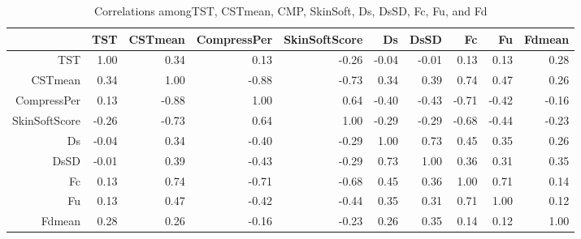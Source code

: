 \begin{center}
\begin{landscape}
\begin{table}[ht]
\caption{Correlations amongTST, CSTmean, CMP, SkinSoft, Ds, DsSD, Fc, Fu, and Fd} 
\vspace{0.2in}
\label{tab:collfibcor}
\begin{tabular}{|rrrrrrrrrr|}
  \hline
 & TST & CSTmean & CompressPer & SkinSoftScore & Ds & DsSD & Fc & Fu & Fdmean \\ 
  \hline
TST & 1.00 & 0.34 & 0.13 & -0.26 & -0.04 & -0.01 & 0.13 & 0.13 & 0.28 \\ 
  CSTmean & 0.34 & 1.00 & -0.88 & -0.73 & 0.34 & 0.39 & 0.74 & 0.47 & 0.26 \\ 
  CompressPer & 0.13 & -0.88 & 1.00 & 0.64 & -0.40 & -0.43 & -0.71 & -0.42 & -0.16 \\ 
  SkinSoftScore & -0.26 & -0.73 & 0.64 & 1.00 & -0.29 & -0.29 & -0.68 & -0.44 & -0.23 \\ 
  Ds & -0.04 & 0.34 & -0.40 & -0.29 & 1.00 & 0.73 & 0.45 & 0.35 & 0.26 \\ 
  DsSD & -0.01 & 0.39 & -0.43 & -0.29 & 0.73 & 1.00 & 0.36 & 0.31 & 0.35 \\ 
  Fc & 0.13 & 0.74 & -0.71 & -0.68 & 0.45 & 0.36 & 1.00 & 0.71 & 0.14 \\ 
  Fu & 0.13 & 0.47 & -0.42 & -0.44 & 0.35 & 0.31 & 0.71 & 1.00 & 0.12 \\ 
  Fdmean & 0.28 & 0.26 & -0.16 & -0.23 & 0.26 & 0.35 & 0.14 & 0.12 & 1.00 \\ 
   \hline
\end{tabular}
\end{table}
\end{landscape}
\end{center}


